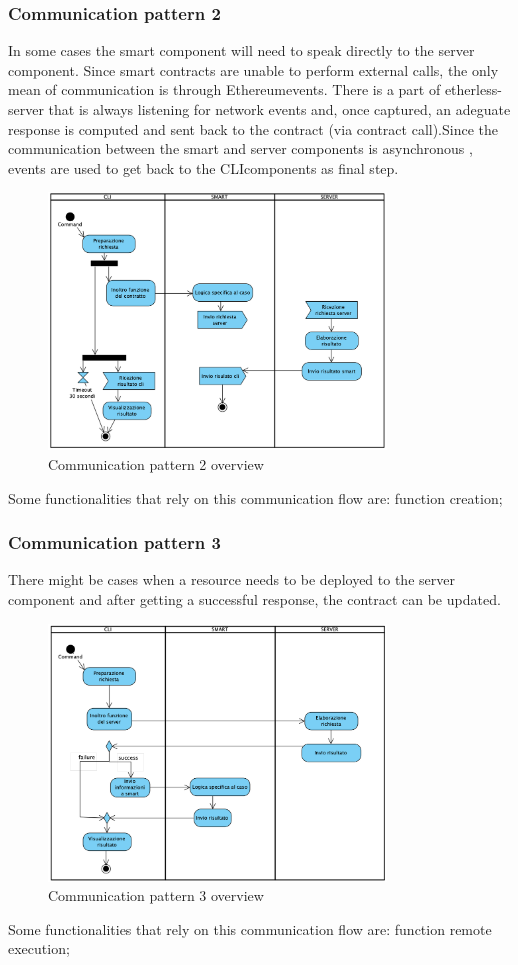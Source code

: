 \subsubsection{Communication pattern 2}
In some cases the smart component will need to speak directly to the server component. Since smart contracts are unable to perform external calls, the only mean of communication is through Ethereum\glo events. There is a part of etherless-server that is always listening for network events and, once captured, an adeguate response is computed and sent back to the contract (via contract call).\newline Since the communication between the smart and server components is asynchronous , events are used to get back to the CLI\glo components as final step.
\begin{figure}[H]
	\centering
	\includegraphics[width=0.8\textwidth]{res/img/pattern2.png}
	\caption{Communication pattern 2 overview}
\end{figure}
Some functionalities that rely on this communication flow are: function creation;
\newpage
\subsubsection{Communication pattern 3}
There might be cases when a resource needs to be deployed to the server component and after getting a successful response, the contract can be updated.
\begin{figure}[H]
	\centering
	\includegraphics[width=0.8\textwidth]{res/img/pattern3.png}
	\caption{Communication pattern 3 overview}
\end{figure}
Some functionalities that rely on this communication flow are: function remote execution; 